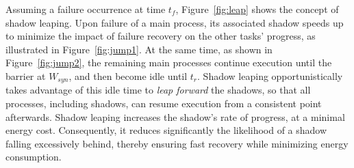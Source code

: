 Assuming a failure occurrence at time $t_f$, Figure~\ref{fig:leap} shows the concept of shadow leaping. 
Upon failure of a main process, its associated shadow speeds up to minimize the impact of failure recovery on the other tasks' progress, as illustrated in Figure~\ref{fig:jump1}. 
At the same time, as shown in Figure~\ref{fig:jump2}, the remaining main processes continue execution until the barrier at $W_{syn}$, and then become idle until $t_r$. %
Shadow leaping opportunistically takes advantage of this idle time to {\it leap forward} the shadows, so that  
all processes, including shadows, can resume execution from a consistent point afterwards. %
Shadow leaping increases the shadow's rate of progress, at a minimal energy cost. Consequently, it reduces significantly the likelihood of a shadow falling excessively behind, thereby ensuring fast recovery while minimizing energy consumption.



